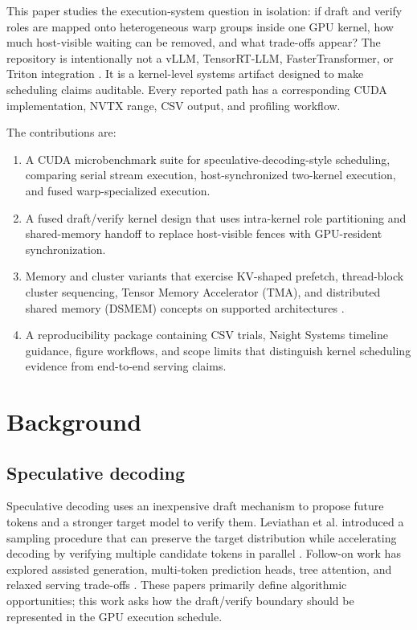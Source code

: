 \documentclass[11pt]{article}
\begin{document}
This paper studies the execution-system question in isolation: if draft and verify roles are mapped onto heterogeneous warp groups inside one GPU kernel, how much host-visible waiting can be removed, and what trade-offs appear? The repository is intentionally not a vLLM, TensorRT-LLM, FasterTransformer, or Triton integration \cite{kwon2023pagedattention,nvidiaTensorRTLLM,nvidiaFasterTransformer}. It is a kernel-level systems artifact designed to make scheduling claims auditable. Every reported path has a corresponding CUDA implementation, NVTX range, CSV output, and profiling workflow.

The contributions are:
\begin{enumerate}[leftmargin=1.5em]
  \item A CUDA microbenchmark suite for speculative-decoding-style scheduling, comparing serial stream execution, host-synchronized two-kernel execution, and fused warp-specialized execution.
  \item A fused draft/verify kernel design that uses intra-kernel role partitioning and shared-memory handoff to replace host-visible fences with GPU-resident synchronization.
  \item Memory and cluster variants that exercise KV-shaped prefetch, thread-block cluster sequencing, Tensor Memory Accelerator (TMA), and distributed shared memory (DSMEM) concepts on supported architectures \cite{nvidiaHopperGuide,nvidiaCudaGuide}.
  \item A reproducibility package containing CSV trials, Nsight Systems timeline guidance, figure workflows, and scope limits that distinguish kernel scheduling evidence from end-to-end serving claims.
\end{enumerate}

\section{Background}
\subsection{Speculative decoding}
Speculative decoding uses an inexpensive draft mechanism to propose future tokens and a stronger target model to verify them. Leviathan et al. introduced a sampling procedure that can preserve the target distribution while accelerating decoding by verifying multiple candidate tokens in parallel \cite{leviathan2023speculative}. Follow-on work has explored assisted generation, multi-token prediction heads, tree attention, and relaxed serving trade-offs \cite{chen2023accelerating,cai2024medusa}. These papers primarily define algorithmic opportunities; this work asks how the draft/verify boundary should be represented in the GPU execution schedule.
\end{document}
